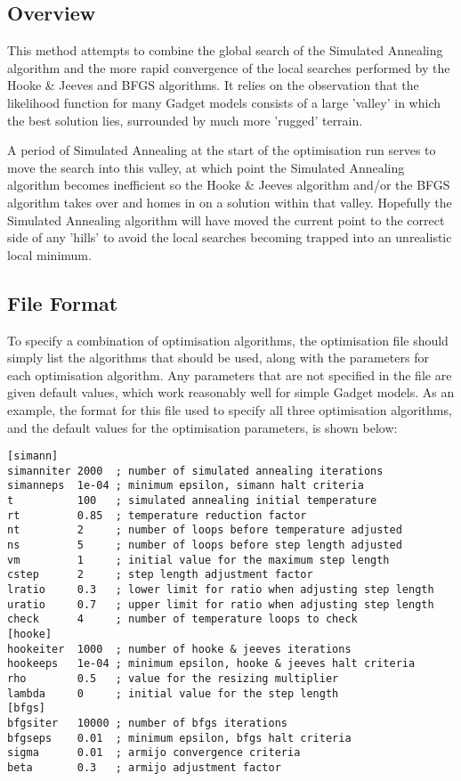\documentclass[10pt,twoside]{book}
\begin{document}
\subsection{Overview}\label{subsec:combineover}
This method attempts to combine the global search of the Simulated Annealing algorithm and the more rapid convergence of the local searches performed by the Hooke \& Jeeves and BFGS algorithms.  It relies on the observation that the likelihood function for many Gadget models consists of a large 'valley' in which the best solution lies, surrounded by much more 'rugged' terrain.

\bigskip
A period of Simulated Annealing at the start of the optimisation run serves to move the search into this valley, at which point the Simulated Annealing algorithm becomes inefficient so the Hooke \& Jeeves algorithm and/or the BFGS algorithm takes over and homes in on a solution within that valley.  Hopefully the Simulated Annealing algorithm will have moved the current point to the correct side of any 'hills' to avoid the local searches becoming trapped into an unrealistic local minimum.

\subsection{File Format}\label{subsec:combinefile}
To specify a combination of optimisation algorithms, the optimisation file should simply list the algorithms that should be used, along with the parameters for each optimisation algorithm.  Any parameters that are not specified in the file are given default values, which work reasonably well for simple Gadget models.  As an example, the format for this file used to specify all three optimisation algorithms, and the default values for the optimisation parameters, is shown below:

{\small\begin{verbatim}
[simann]
simanniter 2000  ; number of simulated annealing iterations
simanneps  1e-04 ; minimum epsilon, simann halt criteria
t          100   ; simulated annealing initial temperature
rt         0.85  ; temperature reduction factor
nt         2     ; number of loops before temperature adjusted
ns         5     ; number of loops before step length adjusted
vm         1     ; initial value for the maximum step length
cstep      2     ; step length adjustment factor
lratio     0.3   ; lower limit for ratio when adjusting step length
uratio     0.7   ; upper limit for ratio when adjusting step length
check      4     ; number of temperature loops to check
[hooke]
hookeiter  1000  ; number of hooke & jeeves iterations
hookeeps   1e-04 ; minimum epsilon, hooke & jeeves halt criteria
rho        0.5   ; value for the resizing multiplier
lambda     0     ; initial value for the step length
[bfgs]
bfgsiter   10000 ; number of bfgs iterations
bfgseps    0.01  ; minimum epsilon, bfgs halt criteria
sigma      0.01  ; armijo convergence criteria
beta       0.3   ; armijo adjustment factor
\end{verbatim}}
\end{document}
